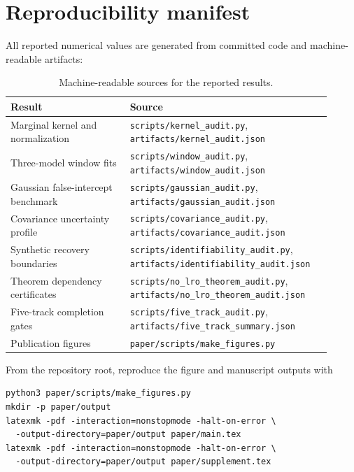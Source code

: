 \documentclass[aps,prb,preprint,notitlepage,groupedaddress,amsmath,amssymb,
               superscriptaddress,nofootinbib,floatfix]{revtex4-2}
\theoremstyle{definition}
\theoremstyle{plain}
\begin{document}
\section{Reproducibility manifest}

All reported numerical values are generated from committed code and
machine-readable artifacts:

\begin{table}[htbp]
\caption{Machine-readable sources for the reported results.}
\begin{ruledtabular}
\begin{tabular}{p{0.35\linewidth}p{0.56\linewidth}}
\toprule
Result & Source\\
\midrule
Marginal kernel and normalization &
\nolinkurl{scripts/kernel_audit.py},
\nolinkurl{artifacts/kernel_audit.json}\\
Three-model window fits &
\nolinkurl{scripts/window_audit.py},
\nolinkurl{artifacts/window_audit.json}\\
Gaussian false-intercept benchmark &
\nolinkurl{scripts/gaussian_audit.py},
\nolinkurl{artifacts/gaussian_audit.json}\\
Covariance uncertainty profile &
\nolinkurl{scripts/covariance_audit.py},
\nolinkurl{artifacts/covariance_audit.json}\\
Synthetic recovery boundaries &
\nolinkurl{scripts/identifiability_audit.py},
\nolinkurl{artifacts/identifiability_audit.json}\\
Theorem dependency certificates &
\nolinkurl{scripts/no_lro_theorem_audit.py},
\nolinkurl{artifacts/no_lro_theorem_audit.json}\\
Five-track completion gates &
\nolinkurl{scripts/five_track_audit.py},
\nolinkurl{artifacts/five_track_summary.json}\\
Publication figures &
\nolinkurl{paper/scripts/make_figures.py}\\
\bottomrule
\end{tabular}
\end{ruledtabular}
\end{table}

From the repository root, reproduce the figure and manuscript outputs with
\begin{verbatim}
python3 paper/scripts/make_figures.py
mkdir -p paper/output
latexmk -pdf -interaction=nonstopmode -halt-on-error \
  -output-directory=paper/output paper/main.tex
latexmk -pdf -interaction=nonstopmode -halt-on-error \
  -output-directory=paper/output paper/supplement.tex
\end{verbatim}


\end{document}
